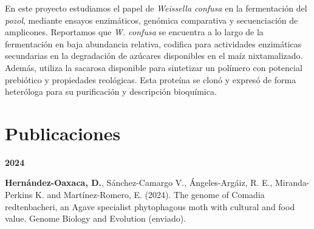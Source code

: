 \documentclass[11pt,a4paper,]{awesome-cv}
\begin{document}
\begin{cventries}
{\begin{cvitems}
\item En este proyecto estudiamos el papel de \textit{Weissella confusa} en la fermentación del \textit{pozol}, mediante ensayos enzimáticos, genómica comparativa y secuenciación de amplicones. Reportamos que \textit{W. confusa} se encuentra a lo largo de la fermentación en baja abundancia relativa, codifica para actividades enzimáticas secundarias en la degradación de azúcares disponibles en el maíz nixtamalizado. Además, utiliza la sacarosa disponible para sintetizar un polímero con potencial prebiótico y propiedades reológicas. Esta proteína se clonó y expresó de forma heteróloga para su purificación y descripción bioquímica.
\end{cvitems}}
\end{cventries}

\hypertarget{publicaciones}{%
\section{Publicaciones}\label{publicaciones}}

\footnotesize
\setlength{\leftskip}{0cm}

\textbf{2024}

\setlength{\leftskip}{1cm}

\textbf{Hernández-Oaxaca, D.}, Sánchez-Camargo V., Ángeles-Argáiz, R.
E., Miranda-Perkins K. and Martínez-Romero, E. (2024). The genome of
Comadia redtenbacheri, an Agave specialist phytophagous moth with
cultural and food value. Genome Biology and Evolution (enviado).
\end{document}
